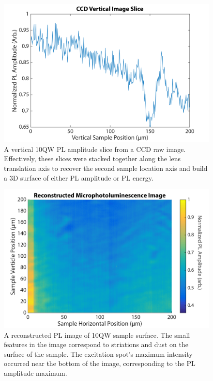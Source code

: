 \begin{figure}[h!]
\centering
\includegraphics[width = .8\textwidth]{RawCCDIMGvertslce.png}
\caption{ \doublespacing A vertical 10QW PL amplitude slice from a CCD raw image. Effectively, these slices were stacked together along the lens translation axis to recover the second sample location axis and build a 3D surface of either PL amplitude or PL energy.}
\label{slice}
\end{figure}
\begin{figure}[h!]
\centering
\includegraphics[width = .8\textwidth]{PLIMG_10QW.png}
\caption{ \doublespacing A reconstructed PL image of 10QW sample surface. The small features in the image correspond to striations and dust on the surface of the sample. The excitation spot's maximum intensity occurred near the bottom of the image, corresponding to the PL amplitude maximum.}
\label{total10qw}
\end{figure}
